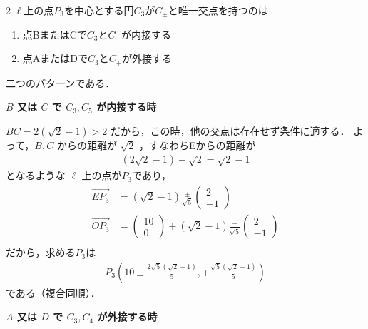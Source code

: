 \documentclass[../../../../main.tex]{subfiles}
\begin{document}
\begin{multicols}{2}
    $\ell$上の点$P_3$を中心とする円$C_3$が$C_{\pm}$と唯一交点を持つのは
    \begin{enumerate}
        \item 点BまたはCで$C_3$と$C_{-}$が内接する \\
        \item 点AまたはDで$C_3$と$C_{+}$が外接する
    \end{enumerate}
    二つのパターンである．

    \textbf{$B$ 又は $C$ で $C_3, C_5$ が内接する時}

    $\overline{BC}=2(\sqrt{2}-1) > 2$ だから，この時，他の交点は存在せず条件に適する．
    よって，$B, C$ からの距離が $\sqrt{2}$ ，すなわちEからの距離が
    \begin{align*}
        \left(2\sqrt{2}-1\right) - \sqrt{2} = \sqrt{2}-1
    \end{align*}
    となるような $\ell$ 上の点が$P_3$であり，
    \begin{align*}
        \overrightarrow{EP_3}
         & = (\sqrt{2}-1)\frac{\pm}{\sqrt{5}}\begin{pmatrix} 2 \\ -1 \end{pmatrix}                                         \\
        \overrightarrow{OP_3}
         & = \begin{pmatrix} 10 \\ 0 \end{pmatrix} + (\sqrt{2}-1)\frac{\pm}{\sqrt{5}}\begin{pmatrix} 2 \\ -1 \end{pmatrix} \\
    \end{align*}
    だから，求める$P_3$は
    \begin{align*}
        P_3\left(10\pm\frac{2\sqrt{5}(\sqrt{2}-1)}{5}, \mp\frac{\sqrt{5}(\sqrt{2}-1)}{5}\right)
    \end{align*}
    である（複合同順）．

    \vspace{5pt}
    \textbf{$A$ 又は $D$ で $C_3, C_4$ が外接する時}


\end{multicols}
\end{document}
